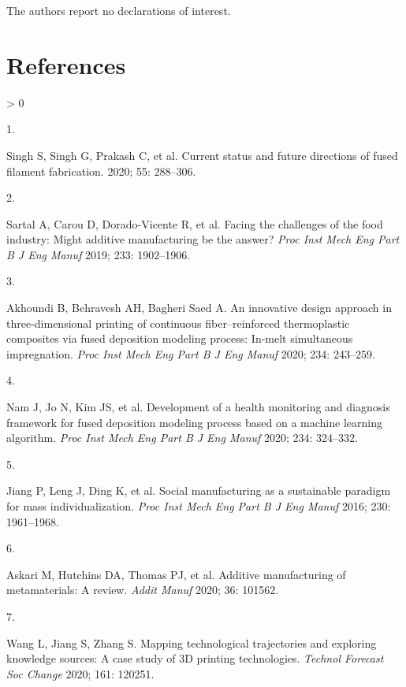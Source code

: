 \documentclass[
  12pt]{article}
\newlength{\cslhangindent}
\newlength{\csllabelwidth}
\newenvironment{CSLReferences}[2] %
 {%
  \setlength{\parindent}{0pt}
  \ifodd #1 \everypar{\setlength{\hangindent}{\cslhangindent}}\ignorespaces\fi
  \ifnum #2 > 0
  \setlength{\parskip}{#2\baselineskip}
  \fi
 }%
 {}
\newcommand{\CSLLeftMargin}[1]{\parbox[t]{\csllabelwidth}{#1}}
\newcommand{\CSLRightInline}[1]{\parbox[t]{\linewidth - \csllabelwidth}{#1}\break}
\begin{document}
The authors report no declarations of interest.

\newpage

\hypertarget{references}{%
\section*{References}\label{references}}

\hypertarget{refs}{}
\begin{CSLReferences}{0}{0}
\leavevmode\hypertarget{ref-Singh2020d}{}%
\CSLLeftMargin{1. }
\CSLRightInline{Singh S, Singh G, Prakash C, et al. {Current status and future directions of fused filament fabrication}. 2020; 55: 288--306.}

\leavevmode\hypertarget{ref-Sartal2018}{}%
\CSLLeftMargin{2. }
\CSLRightInline{Sartal A, Carou D, Dorado-Vicente R, et al. {Facing the challenges of the food industry: Might additive manufacturing be the answer?} \emph{Proc Inst Mech Eng Part B J Eng Manuf} 2019; 233: 1902--1906.}

\leavevmode\hypertarget{ref-Akhoundi2019}{}%
\CSLLeftMargin{3. }
\CSLRightInline{Akhoundi B, Behravesh AH, Bagheri Saed A. {An innovative design approach in three-dimensional printing of continuous fiber--reinforced thermoplastic composites via fused deposition modeling process: In-melt simultaneous impregnation}. \emph{Proc Inst Mech Eng Part B J Eng Manuf} 2020; 234: 243--259.}

\leavevmode\hypertarget{ref-Nam2019}{}%
\CSLLeftMargin{4. }
\CSLRightInline{Nam J, Jo N, Kim JS, et al. {Development of a health monitoring and diagnosis framework for fused deposition modeling process based on a machine learning algorithm}. \emph{Proc Inst Mech Eng Part B J Eng Manuf} 2020; 234: 324--332.}

\leavevmode\hypertarget{ref-Jiang2016}{}%
\CSLLeftMargin{5. }
\CSLRightInline{Jiang P, Leng J, Ding K, et al. {Social manufacturing as a sustainable paradigm for mass individualization}. \emph{Proc Inst Mech Eng Part B J Eng Manuf} 2016; 230: 1961--1968.}

\leavevmode\hypertarget{ref-Askari2020}{}%
\CSLLeftMargin{6. }
\CSLRightInline{Askari M, Hutchins DA, Thomas PJ, et al. {Additive manufacturing of metamaterials: A review}. \emph{Addit Manuf} 2020; 36: 101562.}

\leavevmode\hypertarget{ref-Wang2020f}{}%
\CSLLeftMargin{7. }
\CSLRightInline{Wang L, Jiang S, Zhang S. {Mapping technological trajectories and exploring knowledge sources: A case study of 3D printing technologies}. \emph{Technol Forecast Soc Change} 2020; 161: 120251.}


\end{CSLReferences}
\end{document}
